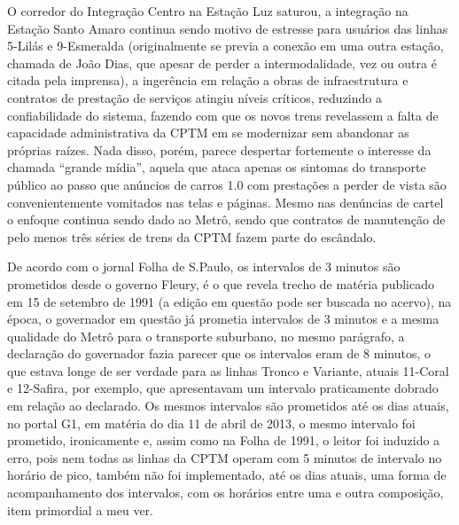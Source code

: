 \documentclass[11pt,fleqn]{book} %
\begin{document}
O corredor do Integração Centro na Estação Luz saturou, a integração na Estação Santo Amaro continua sendo motivo de estresse para usuários das linhas 5-Lilás e 9-Esmeralda (originalmente se previa a conexão em uma outra estação, chamada de João Dias, que apesar de perder a intermodalidade, vez ou outra é citada pela imprensa), a ingerência em relação a obras de infraestrutura e contratos de prestação de serviços atingiu níveis críticos, reduzindo a confiabilidade do sistema, fazendo com que os novos trens revelassem a falta de capacidade administrativa da CPTM em se modernizar sem abandonar as próprias raízes. Nada disso, porém, parece despertar fortemente o interesse da chamada “grande mídia”, aquela que ataca apenas os sintomas do transporte público ao passo que anúncios de carros 1.0 com prestações a perder de vista são convenientemente vomitados nas telas e páginas. Mesmo nas denúncias de cartel o enfoque continua sendo dado ao Metrô, sendo que contratos de manutenção de pelo menos três séries de trens da CPTM fazem parte do escândalo.

De acordo com o jornal Folha de S.Paulo, os intervalos de 3 minutos são prometidos desde o governo Fleury, é o que revela trecho de matéria publicado em 15 de setembro de 1991 (a edição em questão pode ser buscada no acervo), na época, o governador em questão já prometia intervalos de 3 minutos e a mesma qualidade do Metrô para o transporte suburbano, no mesmo parágrafo, a declaração do governador fazia parecer que os intervalos eram de 8 minutos, o que estava longe de ser verdade para as linhas Tronco e Variante, atuais 11-Coral e 12-Safira, por exemplo, que apresentavam um intervalo praticamente dobrado em relação ao declarado. Os mesmos intervalos são prometidos até os dias atuais, no portal G1, em matéria do dia 11 de abril de 2013, o mesmo intervalo foi prometido, ironicamente e, assim como na Folha de 1991, o leitor foi induzido a erro, pois nem todas as linhas da CPTM operam com 5 minutos de intervalo no horário de pico, também não foi implementado, até os dias atuais, uma forma de acompanhamento dos intervalos, com os horários entre uma e outra composição, item primordial a meu ver.
\end{document}
